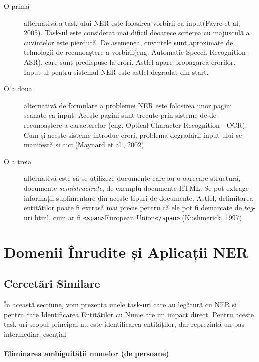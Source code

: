 \begin{description}
\item[O primă] alternativă a task-ului NER este folosirea vorbirii ca input(Favre et al, 2005).\cite{favre2005} Task-ul este considerat mai dificil deoarece scrierea cu majusculă a cuvintelor este pierdută. De asemenea, cuvintele sunt aproximate de tehnologii de recunoaștere a vorbirii(eng. Automatic Speech Recognition - ASR), care sunt predispuse la erori. Astfel apare propagarea erorilor. Input-ul pentru sistemul NER este astfel degradat din start.

\item[O a doua] alternativă de formulare a problemei NER este folosirea unor pagini scanate ca input. Aceste pagini sunt trecute prin sisteme de de recunoaștere a caracterelor (eng. Optical Character Recognition - OCR). Cum și aceste sisteme introduc erori, problema degradării input-ului se manifestă și aici.(Maynard et al., 2002)\cite{maynard2002}

\item[O a treia] alternativă este să se utilizeze documente care au o oarecare structură, documente \textit{semistructrate}, de exemplu documente HTML. Se pot extrage informații suplimentare din aceste tipuri de documente. Astfel, delimitarea entităților poate fi extrasă mai precis pentru că ele pot fi demarcate de \textit{tag}-uri html, cum ar fi \texttt{<span>}European Union\texttt{</span>}.(Kushmerick, 1997)\cite{kushmerick1997}

\end{description}

\section{Domenii Înrudite și Aplicații NER}

\subsection{Cercetări Similare}

În această secțiune, vom prezenta unele task-uri care au legătură cu NER și pentru care Identificarea Entităților cu Nume are un impact direct. Pentru aceste task-uri scopul principal nu este identificarea entităților, dar reprezintă un pas intermediar, esențial.

\paragraph{Eliminarea ambiguității numelor (de persoane)}

